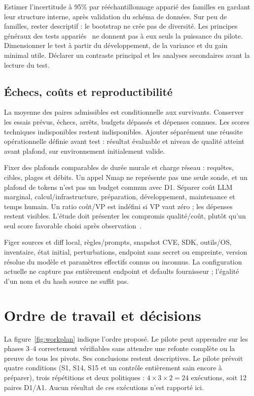 \documentclass[11pt,a4paper]{article}
\begin{document}
Estimer l'incertitude à 95\% par rééchantillonnage apparié des familles en gardant
leur structure interne, après validation du schéma de données. Sur peu de
familles, rester descriptif : le bootstrap ne crée pas de diversité. Les
principes généraux des tests appariés~\cite{dror} ne donnent pas à eux seuls la
puissance du pilote. Dimensionner le test à partir du développement, de la
variance et du gain minimal utile. Déclarer un contraste principal et les
analyses secondaires avant la lecture du test.

\subsection{Échecs, coûts et reproductibilité}
La moyenne des paires admissibles est conditionnelle aux survivants. Conserver
les essais prévus, échecs, arrêts, budgets dépassés et dépenses connues. Les
scores techniques indisponibles restent indisponibles. Ajouter séparément une
réussite opérationnelle définie avant test : résultat évaluable et niveau de
qualité atteint avant plafond, sur environnement initialement valide.

Fixer des plafonds comparables de durée murale et charge réseau : requêtes,
cibles, plages et débits. Un appel Nmap ne représente pas une seule sonde, et un
plafond de tokens n'est pas un budget commun avec D1. Séparer coût LLM marginal,
calcul/infrastructure, préparation, développement, maintenance et temps humain.
Un ratio coût/VP est indéfini si VP vaut zéro ; les dépenses restent visibles.
L'étude doit présenter les compromis qualité/coût, plutôt qu'un seul score
favorable choisi après observation~\cite{matter}.

Figer sources et diff local, règles/prompts, snapshot CVE, SDK, outils/OS,
inventaire, état initial, perturbations, endpoint sans secret ou empreinte,
version résolue du modèle et paramètres effectifs connus ou inconnus. La
configuration actuelle ne capture pas entièrement endpoint et defaults
fournisseur ; l'égalité d'un nom et du hash source ne suffit pas.

\section{Ordre de travail et décisions}
La figure~\ref{fig:workplan} indique l'ordre proposé. Le pilote peut apprendre
sur les phases 3--4 correctement vérifiables sans attendre une refonte complète
ou la preuve de tous les pivots. Ses conclusions restent descriptives. Le pilote prévoit quatre conditions (S1, S14, S15 et un contrôle entièrement
sain encore à préparer), trois répétitions et deux politiques :
$4\times3\times2=24$ exécutions, soit 12 paires D1/A1.
Aucun résultat de ces exécutions n'est rapporté ici.
\end{document}
